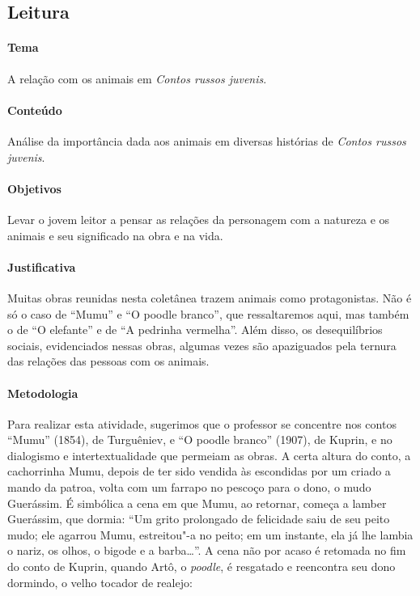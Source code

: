 \documentclass[11pt]{extarticle}
\begin{document}

\subsection{Leitura}


\paragraph{Tema} A relação com os animais em \emph{Contos russos juvenis}.


\paragraph{Conteúdo}
Análise da importância dada aos animais em diversas histórias de
\emph{Contos russos juvenis}.

\paragraph{Objetivos}
Levar o jovem leitor a pensar as relações da personagem com a natureza e
os animais e seu significado na obra e na vida.

\paragraph{Justificativa}
Muitas obras reunidas nesta coletânea trazem animais como protagonistas.
Não é só o caso de ``Mumu'' e ``O poodle branco'', que ressaltaremos aqui,
mas também o de ``O elefante'' e de ``A pedrinha vermelha''. Além
disso, os desequilíbrios sociais, evidenciados nessas obras, algumas
vezes são apaziguados pela ternura das relações das pessoas com os
animais.

\paragraph{Metodologia}
Para realizar esta atividade, sugerimos que o professor se concentre nos
contos ``Mumu'' (1854), de Turguêniev, e ``O poodle branco''
(1907), de Kuprin, e no dialogismo e intertextualidade que permeiam as
obras. A certa altura do conto, a cachorrinha Mumu, depois de ter sido
vendida às escondidas por um criado a mando da patroa, volta com um farrapo no pescoço para o
dono, o mudo Guerássim. É simbólica a cena em
que Mumu, ao retornar, começa a lamber Guerássim, que dormia: ``Um grito
prolongado de felicidade saiu de seu peito mudo; ele agarrou Mumu,
estreitou"-a no peito; em um instante, ela já lhe lambia o nariz, os
olhos, o bigode e a barba\ldots{}''. A cena não por acaso é retomada no fim
do conto de Kuprin, quando Artô, o \emph{poodle}, é resgatado e
reencontra seu dono dormindo, o velho tocador de realejo:
\end{document}
